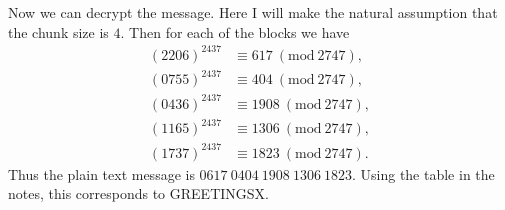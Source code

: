 \documentclass{article}
\newcommand{\Mod}[1]{\ (\mathrm{mod}\ #1)}
\begin{document}
Now we can decrypt the message. Here I will make the natural assumption
that the chunk size is $4$. Then for each of the blocks we have
%
\begin{align*}
    (2206)^{2437} &\equiv 617 \Mod{2747}, \\
    (0755)^{2437} &\equiv 404 \Mod{2747}, \\
    (0436)^{2437} &\equiv 1908 \Mod{2747}, \\
    (1165)^{2437} &\equiv 1306 \Mod{2747}, \\
    (1737)^{2437} &\equiv 1823 \Mod{2747}
    .
\end{align*}
%
Thus the plain text message is $0617 \ 0404 \ 1908 \ 1306 \ 1823$. Using
the table in the notes, this corresponds to GREETINGSX.
\end{document}
